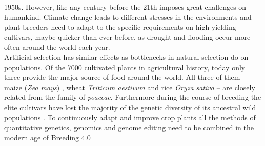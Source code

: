 1950s. However, like any century before the 21th imposes great challenges on
humankind. Climate change leads to different stresses in the environments and plant
breeders need to adapt to the specific requirements on high-yielding cultivars, maybe
quicker than ever before, as drought and flooding occur more often around the world each
year. \\
Artificial selection has similar effects as bottlenecks in natural selection do on
populations.  Of the 7000 cultivated plants in agricultural history, today only three
provide the major source of food around the world. All three of them -- maize (\textit{Zea
  mays}) , wheat \textit{Triticum aestivum} and rice \textit{Oryza sativa} -- are closely
related from the family of \textit{poaceae}. Furthermore during the course of breeding the
elite cultivars have lost the majority of the genetic diversity of its ancestral wild
populations \cite{walsh2018}. To continuously adapt and improve crop plants all the methods of quantitative genetics, genomics and genome editing need to be combined in the modern age of Breeding 4.0 \cite{wallace2018road}
